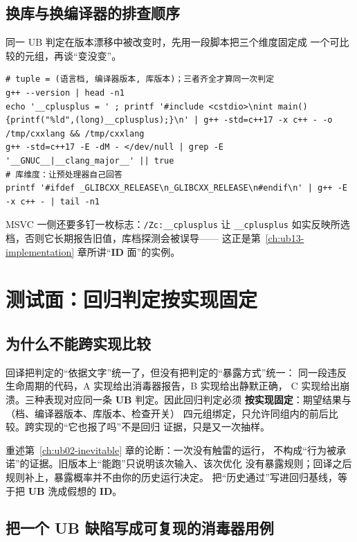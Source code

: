 \documentclass[12pt,a4paper,fontset=fandol]{ctexbook}
\newcommand{\Tp}[1]{\texttt{#1}}
\newcommand{\UB}{\textbf{\textsf{UB}}}
\newcommand{\IDB}{\textbf{\textsf{ID}}}
\begin{document}
\subsection{换库与换编译器的排查顺序}

同一 UB 判定在版本漂移中被改变时，先用一段脚本把三个维度固定成
一个可比较的元组，再谈“变没变”。

\begin{lstlisting}[style=shellstyle, caption={shellstyle：固定三元组并打印判定所依据的档位}]
# tuple = (语言档, 编译器版本, 库版本)；三者齐全才算同一次判定
g++ --version | head -n1
echo '__cplusplus = ' ; printf '#include <cstdio>\nint main(){printf("%ld",(long)__cplusplus);}\n' | g++ -std=c++17 -x c++ - -o /tmp/cxxlang && /tmp/cxxlang
g++ -std=c++17 -E -dM - </dev/null | grep -E '__GNUC__|__clang_major__' || true
# 库维度：让预处理器自己回答
printf '#ifdef _GLIBCXX_RELEASE\n_GLIBCXX_RELEASE\n#endif\n' | g++ -E -x c++ - | tail -n1
\end{lstlisting}

MSVC 一侧还要多钉一枚标志：\Tp{/Zc:\_\_cplusplus} 让 \Tp{\_\_cplusplus}
如实反映所选档，否则它长期报告旧值，库档探测会被误导——
这正是第~\ref{ch:ub13-implementation} 章所讲“\IDB{} 面”的实例。

\section{测试面：回归判定按实现固定}\label{sec:ub15-testing}

\subsection{为什么不能跨实现比较}

回译把判定的“依据文字”统一了，但没有把判定的“暴露方式”统一：
同一段违反生命周期的代码，A 实现给出消毒器报告，B 实现给出静默正确，
C 实现给出崩溃。三种表现对应同一条 \UB{} 判定。因此回归判定必须
\textbf{按实现固定}：期望结果与（档、编译器版本、库版本、检查开关）
四元组绑定，只允许同组内的前后比较。跨实现的“它也报了吗”不是回归
证据，只是又一次抽样。

\begin{warning}[title=以前能跑不是证据]
重述第~\ref{ch:ub02-inevitable} 章的论断：一次没有触雷的运行，
不构成“行为被承诺”的证据。旧版本上“能跑”只说明该次输入、该次优化
没有暴露规则；回译之后规则补上，暴露概率并不由你的历史运行决定。
把“历史通过”写进回归基线，等于把 \UB{} 洗成假想的 \IDB{}。
\end{warning}

\subsection{把一个 UB 缺陷写成可复现的消毒器用例}
\end{document}
